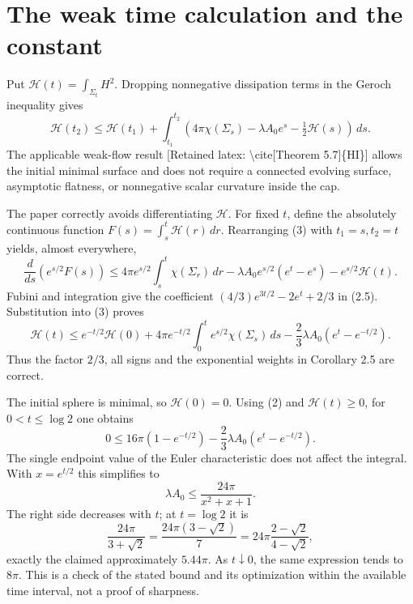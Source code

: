 \documentclass[10pt]{article}
\begin{document}
\section*{The weak time calculation and the constant}
Put \(\mathcal H(t)=\int_{\Sigma_t}H^2\). Dropping nonnegative dissipation terms in the Geroch inequality gives \[\mathcal H(t_2)\le\mathcal H(t_1)+
 \int_{t_1}^{t_2}
 \left(4\pi\chi(\Sigma_s)-\lambda A_0e^s
                         -\tfrac12\mathcal H(s)\right)\,ds.
 \tag{3}\] The applicable weak-flow result [Retained latex: \textbackslash{}cite[Theorem 5.7]\{HI\}] allows the initial minimal surface and does not require a connected evolving surface, asymptotic flatness, or nonnegative scalar curvature inside the cap.\par
The paper correctly avoids differentiating \(\mathcal H\). For fixed \(t\), define the absolutely continuous function \(F(s)=\int_s^t\mathcal H(r)\,dr\). Rearranging (3) with \(t_1=s,t_2=t\) yields, almost everywhere, \[\frac{d}{ds}(e^{s/2}F(s))
 \le 4\pi e^{s/2}\int_s^t\chi(\Sigma_r)\,dr
 -\lambda A_0e^{s/2}(e^t-e^s)-e^{s/2}\mathcal H(t).\] Fubini and integration give the coefficient \((4/3)e^{3t/2}-2e^t+2/3\) in (2.5). Substitution into (3) proves \[\mathcal H(t)\le e^{-t/2}\mathcal H(0)
 +4\pi e^{-t/2}\int_0^t e^{s/2}\chi(\Sigma_s)\,ds
 -\frac23\lambda A_0(e^t-e^{-t/2}).\] Thus the factor \(2/3\), all signs and the exponential weights in Corollary 2.5 are correct.\par
The initial sphere is minimal, so \(\mathcal H(0)=0\). Using (2) and \(\mathcal H(t)\ge0\), for \(0<t\le\log2\) one obtains \[0\le16\pi(1-e^{-t/2})
       -\frac23\lambda A_0(e^t-e^{-t/2}).\] The single endpoint value of the Euler characteristic does not affect the integral. With \(x=e^{t/2}\) this simplifies to \[\lambda A_0\le\frac{24\pi}{x^2+x+1}.\] The right side decreases with \(t\); at \(t=\log2\) it is \[\frac{24\pi}{3+\sqrt2}
 =\frac{24\pi(3-\sqrt2)}7
 =24\pi\frac{2-\sqrt2}{4-\sqrt2},
 \tag{4}\] exactly the claimed approximately \(5.44\pi\). As \(t\downarrow0\), the same expression tends to \(8\pi\). This is a check of the stated bound and its optimization within the available time interval, not a proof of sharpness.\par
\end{document}
